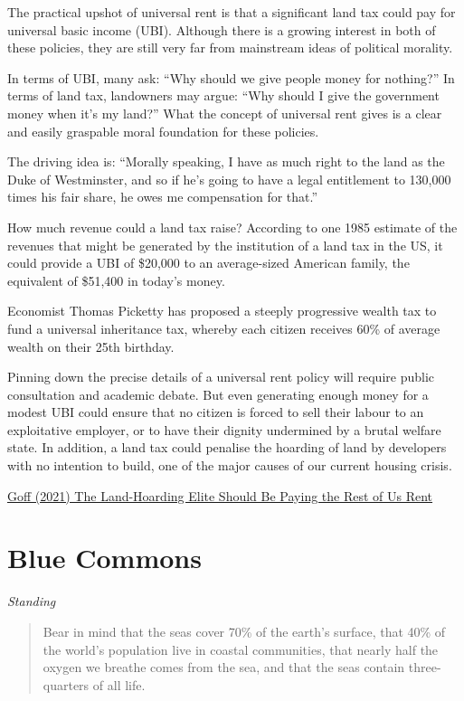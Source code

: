 \documentclass[
]{book}
\begin{document}
The practical upshot of universal rent is that a significant land tax could pay for universal basic income (UBI). Although there is a growing interest in both of these policies, they are still very far from mainstream ideas of political morality.

In terms of UBI, many ask: ``Why should we give people money for nothing?'' In terms of land tax, landowners may argue: ``Why should I give the government money when it's my land?'' What the concept of universal rent gives is a clear and easily graspable moral foundation for these policies.

The driving idea is: ``Morally speaking, I have as much right to the land as the Duke of Westminster, and so if he's going to have a legal entitlement to 130,000 times his fair share, he owes me compensation for that.''

How much revenue could a land tax raise? According to one 1985 estimate of the revenues that might be generated by the institution of a land tax in the US, it could provide a UBI of \$20,000 to an average-sized American family, the equivalent of \$51,400 in today's money.

Economist Thomas Picketty has proposed a steeply progressive wealth tax to fund a universal inheritance tax, whereby each citizen receives 60\% of average wealth on their 25th birthday.

Pinning down the precise details of a universal rent policy will require public consultation and academic debate. But even generating enough money for a modest UBI could ensure that no citizen is forced to sell their labour to an exploitative employer, or to have their dignity undermined by a brutal welfare state. In addition, a land tax could penalise the hoarding of land by developers with no intention to build, one of the major causes of our current housing crisis.

\href{https://novaramedia.com/2021/12/29/the-land-hoarding-elite-should-be-paying-the-rest-of-us-rent/}{Goff (2021) The Land-Hoarding Elite Should Be Paying the Rest of Us Rent}

\hypertarget{blue-commons}{%
\section{Blue Commons}\label{blue-commons}}

\emph{Standing}

\begin{quote}
Bear in mind that the seas cover 70\% of the earth's surface, that 40\% of the world's population live in coastal communities, that nearly half the oxygen we breathe comes from the sea, and that the seas contain three-quarters of all life.
\end{quote}
\end{document}
